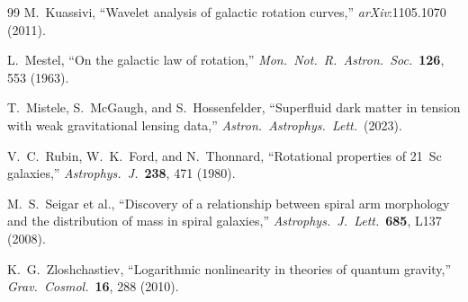 \documentclass[11pt,a4paper]{article}
\begin{document}
\begin{thebibliography}{99}
M.\ Kuassivi, ``Wavelet analysis of galactic rotation curves,''
\textit{arXiv}:1105.1070 (2011).

L.\ Mestel, ``On the galactic law of rotation,''
\textit{Mon.\ Not.\ R.\ Astron.\ Soc.}\ \textbf{126}, 553 (1963).

T.\ Mistele, S.\ McGaugh, and S.\ Hossenfelder,
``Superfluid dark matter in tension with weak gravitational lensing data,''
\textit{Astron.\ Astrophys.\ Lett.}\ (2023).

V.~C.\ Rubin, W.~K.\ Ford, and N.\ Thonnard,
``Rotational properties of 21~Sc galaxies,''
\textit{Astrophys.\ J.}\ \textbf{238}, 471 (1980).

M.~S.\ Seigar et al.,
``Discovery of a relationship between spiral arm morphology and the distribution of
mass in spiral galaxies,''
\textit{Astrophys.\ J.\ Lett.}\ \textbf{685}, L137 (2008).

K.~G.\ Zloshchastiev, ``Logarithmic nonlinearity in theories of quantum gravity,''
\textit{Grav.\ Cosmol.}\ \textbf{16}, 288 (2010).

\end{thebibliography}
\end{document}
